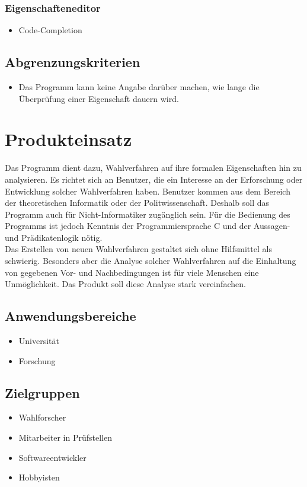 \documentclass[a4paper]{scrreprt}
\begin{document}
\subsection{Eigenschafteneditor}
\begin{itemize}
\item Code-Completion
\end{itemize}


\section{Abgrenzungskriterien}
\begin{itemize}
\item Das Programm kann keine Angabe darüber machen, wie lange die Überprüfung einer Eigenschaft dauern wird.
\end{itemize}



\chapter{Produkteinsatz}
Das Programm dient dazu, Wahlverfahren auf ihre formalen Eigenschaften hin zu analysieren. Es richtet sich an Benutzer, die ein Interesse an der Erforschung oder Entwicklung solcher Wahlverfahren haben. Benutzer kommen aus dem Bereich der theoretischen Informatik oder der Politwissenschaft. Deshalb soll das Programm auch für Nicht-Informatiker zugänglich sein. Für die Bedienung des Programms ist jedoch Kenntnis der Programmiersprache C und der Aussagen- und Prädikatenlogik nötig.\\
Das Erstellen von neuen Wahlverfahren gestaltet sich ohne Hilfsmittel als schwierig. Besonders aber die Analyse solcher Wahlverfahren auf die Einhaltung von gegebenen Vor- und Nachbedingungen ist für viele Menschen eine Unmöglichkeit. Das Produkt soll diese Analyse stark vereinfachen.\\

\section{Anwendungsbereiche}
\begin{itemize}
\item Universität
\item Forschung
\end{itemize}

\section{Zielgruppen}
\begin{itemize}
\item Wahlforscher
\item Mitarbeiter in Prüfstellen
\item Softwareentwickler
\item Hobbyisten
\end{itemize}
\end{document}
